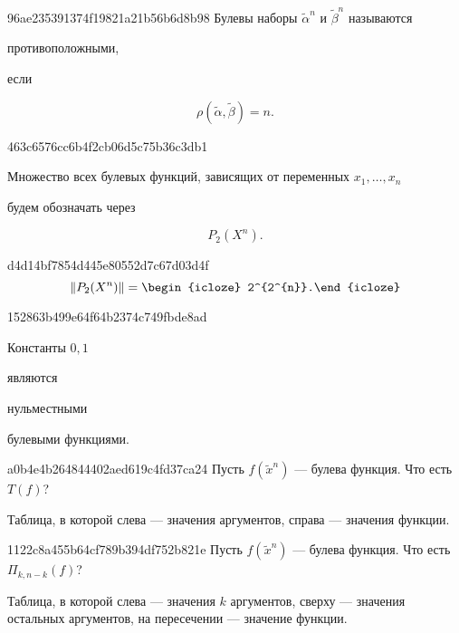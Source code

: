 \begin{note}{96ae235391374f19821a21b56b6d8b98}
    Булевы наборы \({ \widetilde \alpha^{n} }\) и \({ \widetilde \beta^{n} }\) называются \begin{icloze}{2}противоположными,\end{icloze} если
    \begin{icloze}{1}
        \[
            \rho(\widetilde \alpha, \widetilde \beta) = n.
        \]
    \end{icloze}
\end{note}

\begin{note}{463c6576cc6b4f2cb06d5c75b36c3db1}
    \begin{icloze}{2}Множество всех булевых функций, зависящих от переменных \({ x_1, \ldots, x_n }\)\end{icloze} будем обозначать через
    \begin{icloze}{1}
        \[
            P_2(X^{n}).
        \]
    \end{icloze}
\end{note}

\begin{note}{d4d14bf7854d445e80552d7c67d03d4f}
    \[
        \left\lVert P_2(X^{n}) \right\rVert = \begin{icloze}{1}2^{2^{n}}.\end{icloze}
    \]
\end{note}

\begin{note}{152863b499e64f64b2374c749fbde8ad}
    \begin{icloze}{1}Константы \({ 0, 1 }\)\end{icloze} являются \begin{icloze}{2}нульместными\end{icloze} булевыми функциями.
\end{note}

\begin{note}{a0b4e4b264844402aed619c4fd37ca24}
    Пусть \({ f(\widetilde x^{n}) }\) --- булева функция.
    Что есть \({ T(f) }\)?

    \begin{cloze}{1}
        Таблица, в которой слева --- значения аргументов, справа --- значения функции.
    \end{cloze}
\end{note}

\begin{note}{1122c8a455b64cf789b394df752b821e}
    Пусть \({ f(\widetilde x^{n}) }\) --- булева функция.
    Что есть \({ \Pi_{k,n-k}(f) }\)?

    \begin{cloze}{1}
        Таблица, в которой слева --- значения \({ k }\) аргументов, сверху --- значения остальных аргументов, на пересечении --- значение функции.
    \end{cloze}
\end{note}

